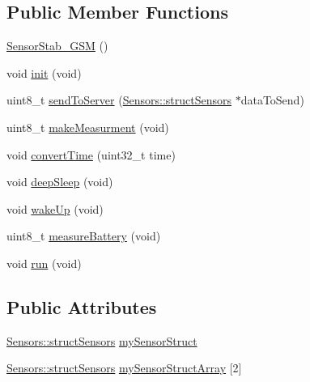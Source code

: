 \subsection*{Public Member Functions}
\begin{DoxyCompactItemize}
\item 
\hyperlink{class_sensor_stab___g_s_m_a15123e48c4d61a1b47197d9e55305a59}{Sensor\+Stab\+\_\+\+G\+SM} ()
\item 
void \hyperlink{class_sensor_stab___g_s_m_adc281d7e98b8fff6ebc2465b0c55f622}{init} (void)
\item 
uint8\+\_\+t \hyperlink{class_sensor_stab___g_s_m_aa620642b5448f12bdb4aab8caf59aa89}{send\+To\+Server} (\hyperlink{struct_sensors_1_1struct_sensors}{Sensors\+::struct\+Sensors} $\ast$data\+To\+Send)
\item 
uint8\+\_\+t \hyperlink{class_sensor_stab___g_s_m_a3c457a4080ceb28f8d008d9620196118}{make\+Measurment} (void)
\item 
void \hyperlink{class_sensor_stab___g_s_m_a9f9b1bae8fb364d611cd851ec8a701d1}{convert\+Time} (uint32\+\_\+t time)
\item 
void \hyperlink{class_sensor_stab___g_s_m_a197de5cdc5b56163c9c0651bdc71f071}{deep\+Sleep} (void)
\item 
void \hyperlink{class_sensor_stab___g_s_m_aff69ae5d87dca122aa332c7a9d5f4628}{wake\+Up} (void)
\item 
uint8\+\_\+t \hyperlink{class_sensor_stab___g_s_m_aeec26c3c973d6d6a5ecc781705a40306}{measure\+Battery} (void)
\item 
void \hyperlink{class_sensor_stab___g_s_m_a19148e9dd70193b620cee72e8f780f3b}{run} (void)
\end{DoxyCompactItemize}
\subsection*{Public Attributes}
\begin{DoxyCompactItemize}
\item 
\hyperlink{struct_sensors_1_1struct_sensors}{Sensors\+::struct\+Sensors} \hyperlink{class_sensor_stab___g_s_m_ae332d79a90b04c5ff482f3cbf27fd530}{my\+Sensor\+Struct}
\item 
\hyperlink{struct_sensors_1_1struct_sensors}{Sensors\+::struct\+Sensors} \hyperlink{class_sensor_stab___g_s_m_a48dc071e4660abfbeb553e9fc0568529}{my\+Sensor\+Struct\+Array} \mbox{[}2\mbox{]}
\end{DoxyCompactItemize}
